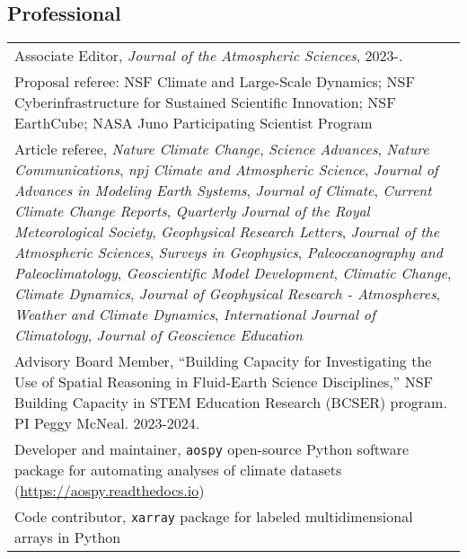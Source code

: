 \documentclass[letterpaper,11pt]{shillcv}
\begin{document}
\subsection*{Professional}
\begin{longtable}{@{} L{\textwidth} @{}}

Associate Editor, \emph{Journal of the Atmospheric Sciences}, 2023-.\\


Proposal referee: NSF Climate and Large-Scale Dynamics; NSF Cyberinfrastructure for Sustained Scientific Innovation; NSF EarthCube; NASA Juno Participating Scientist Program\\

Article referee, \emph{Nature Climate Change}, \emph{Science Advances}, \emph{Nature Communications}, \emph{npj Climate and Atmospheric Science}, \emph{Journal of Advances in Modeling Earth Systems}, \emph{Journal of Climate}, \emph{Current Climate Change Reports}, \emph{Quarterly Journal of the Royal Meteorological Society}, \emph{Geophysical Research Letters}, \emph{Journal of the Atmospheric Sciences}, \emph{Surveys in Geophysics}, \emph{Paleoceanography and Paleoclimatology}, \emph{Geoscientific Model Development}, \emph{Climatic Change}, \emph{Climate Dynamics}, \emph{Journal of Geophysical Research - Atmospheres}, \emph{Weather and Climate Dynamics}, \emph{International Journal of Climatology}, \emph{Journal of Geoscience Education}\\

Advisory Board Member, ``Building Capacity for Investigating the Use of Spatial Reasoning in Fluid-Earth Science Disciplines,'' NSF Building Capacity in STEM Education Research (BCSER) program.  PI Peggy McNeal.  2023-2024.\\

Developer and maintainer, \texttt{aospy} open-source Python software package for automating analyses of climate datasets (\href{https://aospy.readthedocs.io}{https://aospy.readthedocs.io})\\

Code contributor, \texttt{xarray} package for labeled multidimensional arrays in Python\\
\end{longtable}
\end{document}
